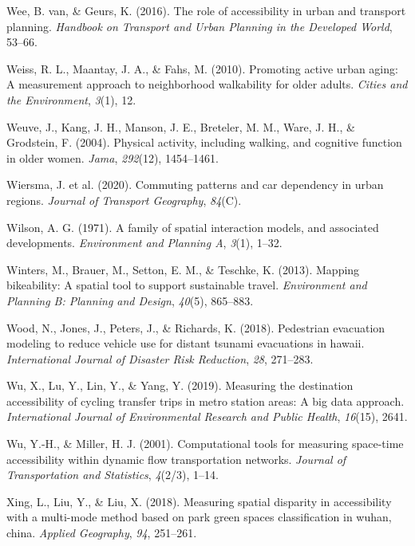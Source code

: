 \documentclass[
11pt, %
oneside, %
english, %
singlespacing, %
]{macthesis} %
\newlength{\cslhangindent}
\newenvironment{CSLReferences}[2] %
{\begin{list}{}{%
	\setlength{\itemindent}{0pt}
	\setlength{\leftmargin}{0pt}
	\setlength{\parsep}{0pt}
	\ifodd #1
	\setlength{\leftmargin}{\cslhangindent}
	\setlength{\itemindent}{-1\cslhangindent}
	\fi
	\setlength{\itemsep}{#2\baselineskip}}}
{\end{list}}
\begin{document}
\begin{CSLReferences}{1}{0}
Wee, B. van, \& Geurs, K. (2016). The role of accessibility in urban and transport planning. \emph{Handbook on Transport and Urban Planning in the Developed World}, 53--66.

Weiss, R. L., Maantay, J. A., \& Fahs, M. (2010). Promoting active urban aging: A measurement approach to neighborhood walkability for older adults. \emph{Cities and the Environment}, \emph{3}(1), 12.

Weuve, J., Kang, J. H., Manson, J. E., Breteler, M. M., Ware, J. H., \& Grodstein, F. (2004). Physical activity, including walking, and cognitive function in older women. \emph{Jama}, \emph{292}(12), 1454--1461.

Wiersma, J. et al. (2020). Commuting patterns and car dependency in urban regions. \emph{Journal of Transport Geography}, \emph{84}(C).

Wilson, A. G. (1971). A family of spatial interaction models, and associated developments. \emph{Environment and Planning A}, \emph{3}(1), 1--32.

Winters, M., Brauer, M., Setton, E. M., \& Teschke, K. (2013). Mapping bikeability: A spatial tool to support sustainable travel. \emph{Environment and Planning B: Planning and Design}, \emph{40}(5), 865--883.

Wood, N., Jones, J., Peters, J., \& Richards, K. (2018). Pedestrian evacuation modeling to reduce vehicle use for distant tsunami evacuations in hawaii. \emph{International Journal of Disaster Risk Reduction}, \emph{28}, 271--283.

Wu, X., Lu, Y., Lin, Y., \& Yang, Y. (2019). Measuring the destination accessibility of cycling transfer trips in metro station areas: A big data approach. \emph{International Journal of Environmental Research and Public Health}, \emph{16}(15), 2641.

Wu, Y.-H., \& Miller, H. J. (2001). Computational tools for measuring space-time accessibility within dynamic flow transportation networks. \emph{Journal of Transportation and Statistics}, \emph{4}(2/3), 1--14.

Xing, L., Liu, Y., \& Liu, X. (2018). Measuring spatial disparity in accessibility with a multi-mode method based on park green spaces classification in wuhan, china. \emph{Applied Geography}, \emph{94}, 251--261.


\end{CSLReferences}
\end{document}
